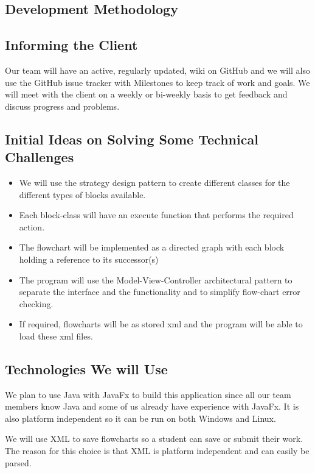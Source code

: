 
\subsection{Development Methodology}


\subsection{Informing the Client}
Our team will have an active, regularly updated, wiki on GitHub and we will also use the GitHub issue tracker with Milestones to keep track of work and goals. We will meet with the client on a weekly or bi-weekly basis to get feedback and discuss progress and problems.

\subsection{Initial Ideas on Solving Some Technical Challenges}
\begin{itemize}
	\item We will use the strategy design pattern to create different classes for the different types of blocks available.
	\item Each block-class will have an execute function that performs the required action.
	\item The flowchart will be implemented as a directed graph with each block holding a reference to its successor(s)
	\item The program will use the Model-View-Controller architectural pattern to separate the interface and the functionality and to simplify flow-chart error checking.
	\item If required, flowcharts will be as stored xml and the program will be able to load these xml files.
\end{itemize}

\subsection{Technologies We will Use}
We plan to use Java with JavaFx to build this application since all our team members know Java and some of us already have experience with JavaFx. It is also platform independent so it can be run on both Windows and Linux.

We will use XML to save flowcharts so a student can save or submit their work. The reason for this choice is that XML is platform independent and can easily be parsed. 

